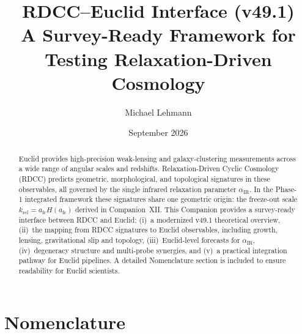 \documentclass[11pt,a4paper]{article}
\title{\textbf{RDCC--Euclid Interface (v49.1)}\\[0.2cm]
\large A Survey-Ready Framework for Testing Relaxation-Driven Cosmology}
\author[1]{Michael Lehmann}
\affil[1]{\small Independent Researcher, Relaxation-Driven Cyclic Cosmology (RDCC)\\
\texttt{mi.lehmann@gmx.de}}
\date{September 2026}
\begin{document}
\maketitle


\begin{abstract}
Euclid provides high-precision weak-lensing and galaxy-clustering measurements
across a wide range of angular scales and redshifts. Relaxation-Driven Cyclic
Cosmology (RDCC) predicts geometric, morphological, and topological signatures
in these observables, all governed by the single infrared relaxation parameter
\(\alpha_{\mathrm{IR}}\). In the Phase-1 integrated framework these signatures
share one geometric origin: the freeze-out scale
\(k_{\mathrm{rel}}=a_{\mathrm{fr}}H(a_{\mathrm{fr}})\) derived in Companion~XII.
This Companion provides a survey-ready interface between RDCC and Euclid:
(i)~a modernized v49.1 theoretical overview, (ii)~the mapping from RDCC
signatures to Euclid observables, including growth, lensing, gravitational
slip and topology, (iii)~Euclid-level forecasts for \(\alpha_{\mathrm{IR}}\),
(iv)~degeneracy structure and multi-probe synergies, and (v)~a practical
integration pathway for Euclid pipelines. A detailed Nomenclature section is
included to ensure readability for Euclid scientists.
\end{abstract}


\section*{Nomenclature}
\end{document}
